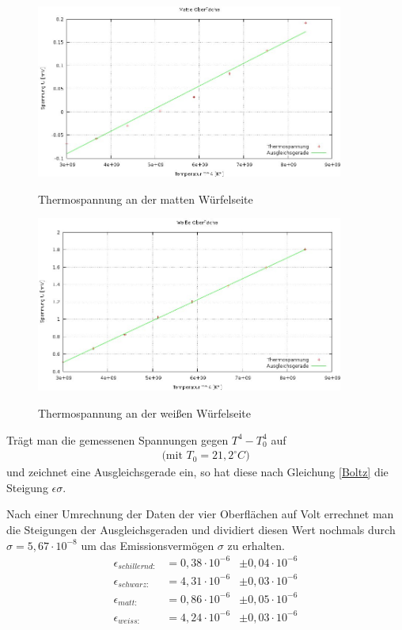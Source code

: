 \begin{figure}[H]
\includegraphics[width=0.9\textwidth]{pics/temp_matt.jpg}
\label{abstand}
\caption{Thermospannung an der matten Würfelseite}
\end{figure}

\begin{figure}[H]
\includegraphics[width=0.9\textwidth]{pics/temp_weis.jpg}
\label{abstand}
\caption{Thermospannung an der weißen Würfelseite}
\end{figure}

Trägt man die gemessenen Spannungen gegen $T^4-T_0^4$ auf
\begin{align*}
\text{(mit } T_0=21,2^\circ C )
\end{align*}
und zeichnet eine Ausgleichsgerade ein, so hat diese nach Gleichung \eqref{Boltz} die Steigung $\epsilon\sigma$.

Nach einer Umrechnung der Daten der vier Oberflächen auf Volt errechnet man die Steigungen der Ausgleichsgeraden und dividiert diesen Wert nochmals durch $\sigma = 5,67\cdot 10^{-8}$ um das Emissionsvermögen $\sigma$ zu erhalten. 
\begin{align*}
\epsilon_{schillernd: }		&= 0,38\cdot10^{-6}     &\pm 0,04\cdot 10^{-6}  \\
\epsilon_{schwarz: }	 	&= 4,31\cdot10^{-6}     &\pm 0,03\cdot 10^{-6}  \\
\epsilon_{matt: }		 	&= 0,86\cdot10^{-6}     &\pm 0,05\cdot 10^{-6}  \\
\epsilon_{weiss: } 			&= 4,24\cdot10^{-6}     &\pm 0,03\cdot 10^{-6}  \\
\end{align*} 


